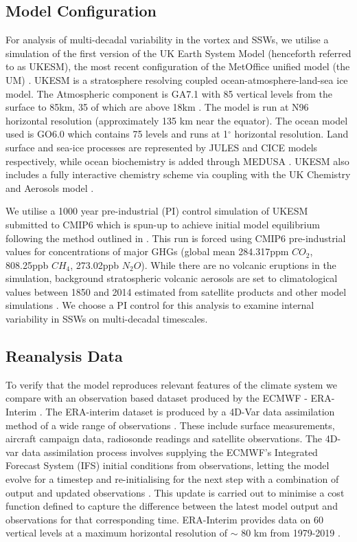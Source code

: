 \subsection{Model Configuration}
For analysis of multi-decadal variability in the vortex and SSWs, we utilise a simulation of the first version of the UK Earth System Model (henceforth referred to as UKESM), the most recent configuration of the MetOffice unified model (the UM) \citep{Mulcahy2018}. UKESM is a stratosphere resolving coupled ocean-atmosphere-land-sea ice model. The Atmospheric component is GA7.1 with 85 vertical levels from the surface to 85km, 35 of which are above 18km \citep{Walters2019, Williams2018}. The model is run at N96 horizontal resolution (approximately 135 km near the equator). The ocean model used is GO6.0 \citep{Storkey2018} which contains 75 levels and runs at 1${^\circ}$ horizontal resolution. Land surface and sea-ice processes are represented by JULES \citep[GL7.0,][]{Walters2019} and CICE  \cite[GSI8.1,][]{Ridley2018} models respectively, while ocean biochemistry is added through MEDUSA \citep{Yool2013}. UKESM also includes a fully interactive chemistry scheme via coupling with the UK Chemistry and Aerosols model \citep[UKCA,][]{Mulcahy2018}.

We utilise a 1000 year pre-industrial (PI) control simulation of UKESM submitted to CMIP6 which is spun-up to achieve initial model equilibrium following the method outlined in \cite{Yool20}. This run is forced using CMIP6 pre-industrial values for concentrations of major GHGs (global mean 284.317ppm $CO_2$, 808.25ppb $CH_4$, 273.02ppb $N_2O$). While there are no volcanic eruptions in the simulation, background stratospheric volcanic aerosols are set to climatological values between 1850 and 2014 estimated from satellite products and other model simulations \citep{Menary2018}. We choose a PI control for this analysis to examine internal variability in SSWs on multi-decadal timescales. 


\subsection{Reanalysis Data}
To verify that the model reproduces relevant features of the climate system we compare with an observation based dataset produced by the ECMWF - ERA-Interim \cite{Dee2011}. The ERA-interim dataset is produced by a 4D-Var data assimilation method of a wide range of observations \citep{Uppala2005}. These include surface measurements, aircraft campaign data, radiosonde readings and satellite observations. The 4D-var data assimilation process involves supplying the ECMWF’s Integrated Forecast System (IFS) initial conditions from observations, letting the model evolve for a timestep and re-initialising for the next step with a combination of output and updated observations \citep{Courtier1998, Bouttier2001}. This update is carried out to minimise a cost function defined to capture the difference between the latest model output and observations for that corresponding time. ERA-Interim provides data on 60 vertical levels at a maximum horizontal resolution of $\sim$ 80 km from 1979-2019 \citep{Berrisford}.

